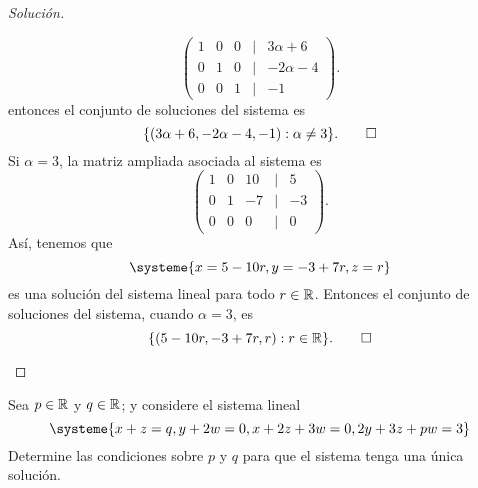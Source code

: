 \documentclass[a4,11pt]{aleph-notas}
\begin{document}
\begin{proof}[Solución]
\begin{enumerate}
    \[
        \begin{pmatrix}
        1&0&0&|& 3 \alpha+6\\
        0&1&0&|&-2\alpha - 4\\
        0&0&1&|& -1
        \end{pmatrix}               .
    \]
    entonces el conjunto de soluciones del sistema es 
    \[
        \{(3 \alpha+6,-2\alpha - 4,-1):\alpha \neq 3\}.\qedhere
    \]
    Si $\alpha = 3 $, la matriz ampliada asociada al sistema es
    \[
        \begin{pmatrix}
        1&0&10&|&5\\
        0&1&-7&|&-3\\
        0&0&0&|&0
        \end{pmatrix}.
    \]
    Así, tenemos que
    \[
    \systeme{x = 5 - 10r, y= -3 +7r, z= r}
    \]
    es una solución del sistema lineal para todo $r \in \mathbb{R}$. Entonces el conjunto de soluciones del sistema, cuando $\alpha = 3$, es
    \[
        \{(5 - 10r,-3 +7r,r):r \in \mathbb{R}\}.\qedhere
    \]
    
 \end{enumerate}
\end{proof}


\begin{ejer}
    Sea $p \in \mathbb{R}$ y $q \in \mathbb{R}$; y considere el sistema lineal
    \[
    \systeme{x+z=q, y+2w=0, x+2z+3w=0, 2y+3z+pw=3}
    \]
    Determine las condiciones sobre $p$ y $q$ para que el sistema tenga una única solución.
\end{ejer}
\end{document}
